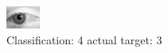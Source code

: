 \begin{figure}[h!]
\begin{center}
\includegraphics[width=0.60\columnwidth]{figures/ID2782_class_4_target_3.png}
\end{center}
\caption{ Classification: 4 actual target: 3}
\label{fig:ID2782_class_4_target_3}
\end{figure}
